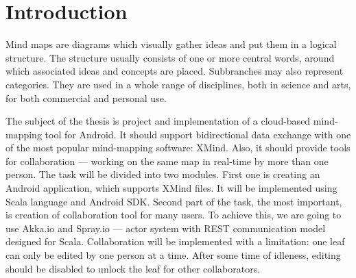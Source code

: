 %
%
%
%
%

\chapter{Introduction}
\label{chap:introduction}




Mind maps are diagrams which visually gather ideas and put them in a logical structure. The structure usually consists of one or more central words, around which associated ideas and concepts are placed. Subbranches may also represent categories. They are used in a whole range of disciplines, both in science and arts, for both commercial and personal use\cite{Gee:2010:Roots}.


The subject of the thesis is project and implementation of a cloud-based mind-mapping tool for Android. It should support bidirectional data exchange with one of the most popular mind-mapping software: XMind. Also, it should provide tools for collaboration --- working on the same map in real-time by more than one person. The task will be divided into two modules. First one is creating an Android application, which supports XMind files. It will be implemented using Scala language and Android SDK. Second part of the task, the most important, is creation of collaboration tool for many users. To achieve this, we are going to use Akka.io and Spray.io --- actor system with REST communication model designed for Scala. Collaboration will be implemented with a limitation: one leaf can only be edited by one person at a time. After some time of idleness, editing should be disabled to unlock the leaf for other collaborators.


